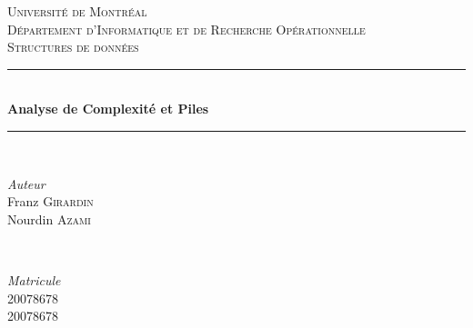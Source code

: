 \documentclass[9pt]{report}
\begin{document}
\begin{titlepage} %
	\newcommand{\HRule}{\rule{\linewidth}{0.5mm}} %
	
	\center %
	
	
	\textsc{\LARGE Université de Montréal}\\[1.5cm] %
	
	\textsc{\Large Département d'Informatique et de Recherche Opérationnelle}\\[0.5cm] %
	
	\textsc{\large Structures de données}\\[0.5cm] %
	
	
	\HRule\\[0.4cm]
	
	{\huge\bfseries Analyse de Complexité et Piles}\\[0.4cm] %
	
	\HRule\\[1.5cm]
	
	
	\begin{minipage}{0.4\textwidth}
		\begin{flushleft}
			\large
			\textit{Auteur}\\
		Franz \textsc{Girardin} \\
    Nourdin \textsc{Azami}
		\end{flushleft}
	\end{minipage}
	~
	\begin{minipage}{0.4\textwidth}
		\begin{flushright}
			\large
			\textit{Matricule}\\
			\textsc{20078678} \\ 
			\textsc{20078678} 
		\end{flushright}
	\end{minipage}
	

\end{titlepage}
\end{document}
